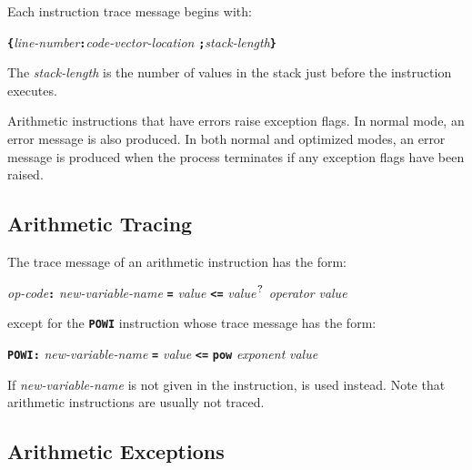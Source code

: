 \documentclass[12pt]{article}
\newcommand{\TT}[1]{{\tt \bfseries #1}}
\newcommand{\QMARK}{{$^{\,\mbox{\footnotesize ?}}$}}
\begin{document}
Each instruction trace message begins with:
\begin{center}
\TT{\{}{\em line-number}\TT{:}{\em code-vector-location}%
                        \TT{;}{\em stack-length}\TT{\}}
\end{center}
The {\em stack-length} is the number of values in the stack
just before the instruction executes.

Arithmetic instructions that have errors raise exception flags.
In normal mode, an error message is also produced.  In both
normal and optimized modes, an error message is produced
when the process terminates if any exception flags have been raised.

\subsection{Arithmetic Tracing}
\label{ARITHMETIC-TRACING}

The trace message of an arithmetic instruction has the form:
\begin{center}
{\em op-code}\TT{:} {\em new-variable-name} \TT{=} {\em value}
                    \TT{<=} {\em value}\QMARK{}
                    {\em operator} {\em value}
\end{center}
except for the \TT{POWI} instruction whose trace message has the form:
\begin{center}
\TT{POWI:} {\em new-variable-name} \TT{=} {\em value}
                    \TT{<=} \TT{pow} {\em exponent} {\em value}
\end{center}
If {\em new-variable-name} is not given in the instruction,
\TT{*} is used instead.
Note that arithmetic instructions are usually not traced.

\subsection{Arithmetic Exceptions}
\label{ARITHMETIC-EXCEPTIONS}
\end{document}
